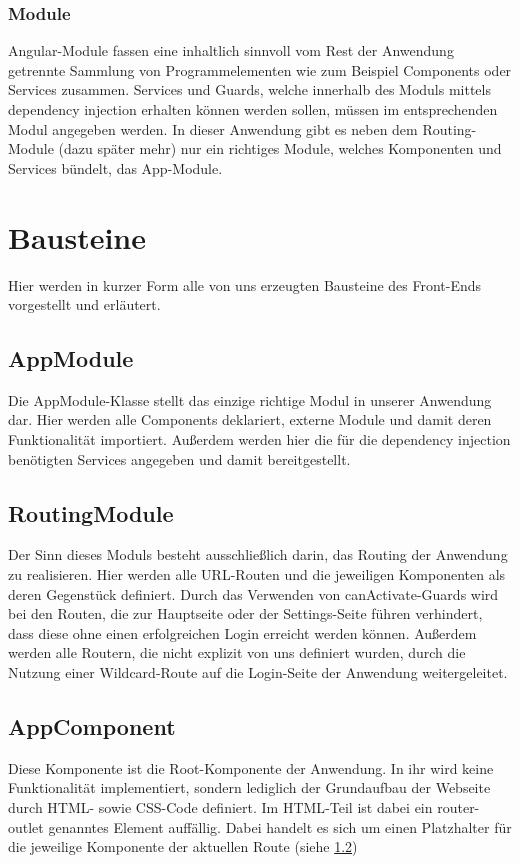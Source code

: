 \subsubsection{Module}
Angular-Module fassen eine inhaltlich sinnvoll vom Rest der Anwendung getrennte Sammlung von Programmelementen wie zum Beispiel Components oder Services zusammen. Services und Guards, welche innerhalb des Moduls mittels dependency injection erhalten können werden sollen, müssen im entsprechenden Modul angegeben werden. In dieser Anwendung gibt es neben dem Routing-Module (dazu später mehr) nur ein richtiges Module, welches Komponenten und Services bündelt, das App-Module.

\section{Bausteine}
Hier werden in kurzer Form alle von uns erzeugten Bausteine des Front-Ends vorgestellt und erläutert.

\subsection{AppModule}
Die AppModule-Klasse stellt das einzige richtige Modul in unserer Anwendung dar. Hier werden alle Components deklariert, externe Module und damit deren Funktionalität importiert. Außerdem werden hier die für die dependency injection benötigten Services angegeben und damit bereitgestellt.

\subsection{RoutingModule}
\label{subsection_routingModule}
Der Sinn dieses Moduls besteht ausschließlich darin, das Routing der Anwendung zu realisieren. Hier werden alle \acs{URL}-Routen und die jeweiligen Komponenten als deren Gegenstück definiert. Durch das Verwenden von canActivate-Guards wird bei den Routen, die zur Hauptseite oder der Settings-Seite führen verhindert, dass diese ohne einen erfolgreichen Login erreicht werden können. Außerdem werden alle Routern, die nicht explizit von uns definiert wurden, durch die Nutzung einer Wildcard-Route auf die Login-Seite der Anwendung weitergeleitet.

\subsection{AppComponent}
Diese Komponente ist die Root-Komponente der Anwendung. In ihr wird keine Funktionalität implementiert, sondern lediglich der Grundaufbau der Webseite durch \acs{HTML}- sowie \acs{CSS}-Code definiert. Im \acs{HTML}-Teil ist dabei ein \glqq{}router-outlet\grqq{} genanntes Element auffällig. Dabei handelt es sich um einen Platzhalter für die jeweilige Komponente der aktuellen Route (siehe \ref{subsection_routingModule})

